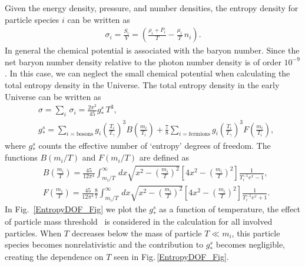Given the energy density, pressure, and number densities, the entropy density for particle species $i$ can be written as 
\begin{align}\label{entropy}
\sigma_i=\frac{S_i}{V}=\left(\frac{\rho_i+P_i}{T}-\frac{\mu_i}{T}\,n_i\right).
\end{align}
In general the chemical potential is associated with the baryon number. Since the net baryon number density relative to the photon number density is of order $10^{-9}$. In this case, we can neglect the small chemical potential when calculating the total entropy density in the Universe. The total entropy density in the early Universe can be written as
\begin{align}
&\sigma=\sum_i\,\sigma_i=\frac{2\pi^2}{45}g^s_\ast\,T^3,\\
&g^s_\ast=\sum_{i=\mathrm{bosons}}g_i\left({\frac{T_i}{T_\gamma}}\right)^3B\left(\frac{m_i}{T_i}\right)+\frac{7}{8}\sum_{i=\mathrm{fermions}}g_i\left({\frac{T_i}{T_\gamma}}\right)^3F\left(\frac{m_i}{T_i}\right),
\end{align}
where $g^s_\ast$ counts the effective number of `entropy' degrees of freedom. The functions $B(m_i/T)$ and $F(m_i/T)$ are defined as 
\begin{align}
&B\left(\frac{m_i}{T}\right)=\frac{45}{12\pi^4}\int^\infty_{m_i/T}\,dx\sqrt{x^2-\left(\frac{m_i}{T}\right)^2}\left[4x^2-\left(\frac{m_i}{T}\right)^2\right]\frac{1}{\Upsilon^{-1}_ie^x-1},\\
&F\left(\frac{m_i}{T}\right)=\frac{45}{12\pi^4}\frac{8}{7}\int^\infty_{m_i/T}\,dx\sqrt{x^2-\left(\frac{m_i}{T}\right)^2}\left[4x^2-\left(\frac{m_i}{T}\right)^2\right]\frac{1}{\Upsilon^{-1}_ie^x+1}.
\end{align}
In Fig.~\ref{EntropyDOF_Fig} we plot the $g^s_\ast$ as a function of temperature, the effect of particle mass threshold~\cite{Coc:2006rt} is considered in the calculation for all involved particles. When $T$ decreases below the mass of particle $T\ll m_i$, this particle species becomes nonrelativistic and the contribution to $g^s_\ast$ becomes negligible, creating the dependence on $T$ seen in Fig.\,\ref{EntropyDOF_Fig}.
